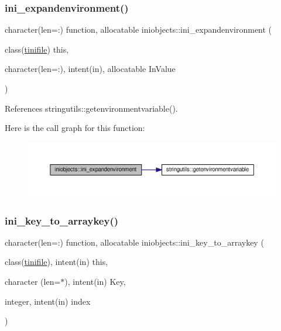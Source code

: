 \subsubsection{\texorpdfstring{ini\+\_\+expandenvironment()}{ini\_expandenvironment()}}
{\footnotesize\ttfamily character(len=\+:) function, allocatable iniobjects\+::ini\+\_\+expandenvironment (\begin{DoxyParamCaption}\item[{class(\mbox{\hyperlink{structiniobjects_1_1tinifile}{tinifile}})}]{this,  }\item[{character(len=\+:), intent(in), allocatable}]{In\+Value }\end{DoxyParamCaption})\hspace{0.3cm}{\ttfamily [private]}}



References stringutils\+::getenvironmentvariable().

Here is the call graph for this function\+:
\nopagebreak
\begin{figure}[H]
\begin{center}
\leavevmode
\includegraphics[width=350pt]{namespaceiniobjects_a3f10c54af4bf829a3e62436354908f1e_cgraph}
\end{center}
\end{figure}
\mbox{\label{namespaceiniobjects_aaf02b1dc48d8287253cf7bf134cc3a73}} 
\subsubsection{\texorpdfstring{ini\+\_\+key\+\_\+to\+\_\+arraykey()}{ini\_key\_to\_arraykey()}}
{\footnotesize\ttfamily character(len=\+:) function, allocatable iniobjects\+::ini\+\_\+key\+\_\+to\+\_\+arraykey (\begin{DoxyParamCaption}\item[{class(\mbox{\hyperlink{structiniobjects_1_1tinifile}{tinifile}}), intent(in)}]{this,  }\item[{character (len=$\ast$), intent(in)}]{Key,  }\item[{integer, intent(in)}]{index }\end{DoxyParamCaption})\hspace{0.3cm}{\ttfamily [private]}}

